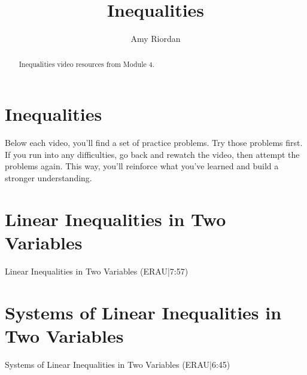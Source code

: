 \documentclass{ximera}
\title{Inequalities}
\author{Amy Riordan}
\begin{document}
\begin{abstract}
Inequalities video resources from Module 4.
\end{abstract}
\maketitle

\section*{Inequalities}

Below each video, you’ll find a set of practice problems. Try those problems first. If you run into any difficulties, go back and rewatch the video, then attempt the problems again. This way, you’ll reinforce what you’ve learned and build a stronger understanding.

\section*{Linear Inequalities in Two Variables}

Linear Inequalities in Two Variables (ERAU|7:57)




\section*{Systems of Linear Inequalities in Two Variables}

Systems of Linear Inequalities in Two Variables (ERAU|6:45)

\end{document}
